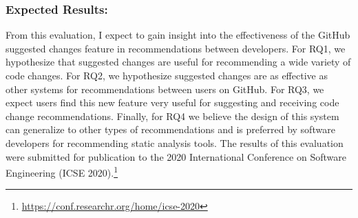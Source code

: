 \subsubsection{Expected Results:} From this evaluation, I expect to gain insight into the effectiveness of the GitHub suggested changes feature in recommendations between developers. For RQ1, we hypothesize that suggested changes are useful for recommending a wide variety of code changes. For RQ2, we hypothesize suggested changes are as effective as other systems for recommendations between users on GitHub. For RQ3, we expect users find this new feature very useful for suggesting and receiving code change recommendations. Finally, for RQ4 we believe the design of this system can generalize to other types of recommendations and is preferred by software developers for recommending static analysis tools. The results of this evaluation were submitted for publication to the 2020 International Conference on Software Engineering (ICSE 2020).\footnote{\url{https://conf.researchr.org/home/icse-2020}}




